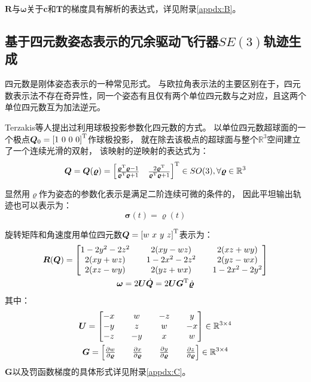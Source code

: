 $\bm{R}$与$\bm{\omega}$关于$\bm{c}$和$\bm{T}$的梯度具有解析的表达式，详见附录\ref{appdx:B}。

\subsection{基于四元数姿态表示的冗余驱动飞行器$SE(3)$轨迹生成}\label{subsec:planning_based_on_quaternion}
四元数是刚体姿态表示的一种常见形式。
与欧拉角表示法的主要区别在于，四元数表示法不存在奇异性，同一个姿态有且仅有两个单位四元数与之对应，且这两个单位四元数互为加法逆元。

Terzakis等人提出过利用球极投影参数化四元数的方式\cite{terzakis2014quaternion}。
以单位四元数超球面的一个极点$\bm{Q}_0=\trans{[1\  0 \ 0 \ 0]}$作球极投影，
就在除去该极点的超球面与整个$\mathbb{R}^3$空间建立了一个连续光滑的双射，
该映射的逆映射的表达式为： 
\begin{equation}
  \bm{Q} = \bm{Q}(\bm{\varrho}) = {
    \begin{bmatrix}
      \frac{{\bm{\varrho}}^{\text{T}}\bm{\varrho}-1}{{\bm{\varrho}}^{\text{T}}\bm{\varrho}+1} & 
      \frac{2{\bm{\varrho}}^{\text{T}}}{{\bm{\varrho}}^{\text{T}}\bm{\varrho}+1}
    \end{bmatrix}
  }^{\text{T}} \in SO(3), \forall \bm{\varrho} \in \mathbb{R}^3
  \label{equ:R3_to_quaternion}
\end{equation}

显然用$\bm{\varrho}$作为姿态的参数化表示是满足二阶连续可微的条件的，
因此平坦输出轨迹也可以表示为：
\begin{equation}
  \bm{\sigma}(t) = \bm{\varrho}(t)
\end{equation}

旋转矩阵和角速度用单位四元数$\bm{Q} = {[w\  x \ y \ z]}^{\text{T}}$表示为：
\begin{gather}
  \bm{R}(\bm{Q}) = 
  \begin{bmatrix}
    1 - 2y^2 -2z^2 & & 2(xy - wz) & & 2(xz + wy) \\ 
    2(xy + wz) & & 1 - 2x^2 - 2z^2 & & 2(yz - wx) \\ 
    2(xz - wy) & & 2(yz + wx) & & 1 - 2x^2 - 2y^2
  \end{bmatrix} \label{equ:quaternion_to_R} \\ 
  \bm{\omega} = 2\bm{U}\dot{\bm{Q}} = 2\bm{U}{\bm{G}}^{\text{T}}\dot{\bm{\varrho}} \label{equ:dquat_to_omega}
\end{gather}
其中： 
\begin{gather}
  \bm{U} = 
  \begin{bmatrix}
    -x & & w & & -z & & y \\
    -y & & z & & w & & -x \\
    -z & & -y & & x & & w
  \end{bmatrix} \in \mathbb{R}^{3\times 4} \label{equ:matrix_U}\\
  \bm{G} = 
  \begin{bmatrix}
    \frac{\partial{w}}{\partial{\bm{\varrho}}} & & \frac{\partial{x}}{\partial{\bm{\varrho}}} & & \frac{\partial{y}}{\partial{\bm{\varrho}}} & & \frac{\partial{z}}{\partial{\bm{\varrho}}}
  \end{bmatrix} \in \mathbb{R}^{3 \times 4} \label{equ:matrix_G}
\end{gather}
$\bm{G}$以及罚函数梯度的具体形式详见附录\ref{appdx:C}。

